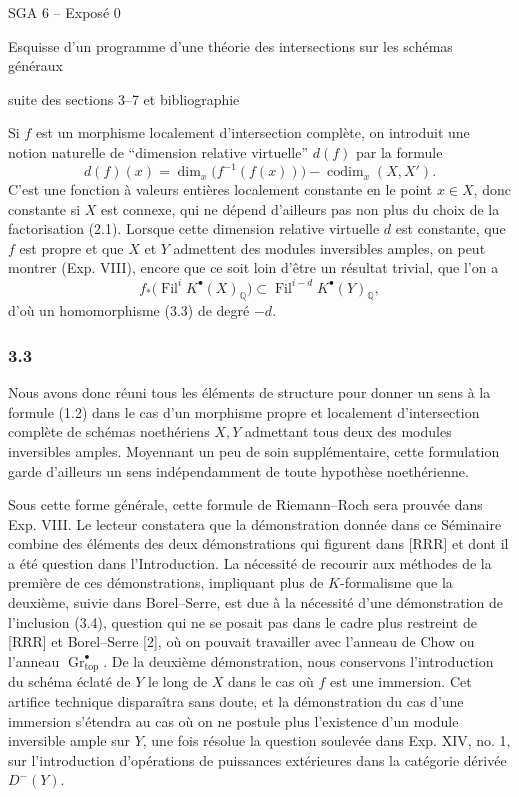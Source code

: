 \documentclass[11pt]{article}
\newcommand{\Gr}{\operatorname{Gr}}
\newcommand{\Fil}{\operatorname{Fil}}
\newcommand{\codim}{\operatorname{codim}}
\begin{document}
\begin{center}
{\Large SGA 6 -- Expos\'e 0}\par
{\large Esquisse d'un programme d'une th\'eorie des intersections sur les sch\'emas g\'en\'eraux}\par
{\large suite des sections 3--7 et bibliographie}
\end{center}

Si $f$ est un morphisme localement d'intersection compl\`ete, on introduit une notion naturelle de ``dimension relative virtuelle'' $d(f)$ par la formule
\[
d(f)(x)=\dim_x\bigl(f^{-1}(f(x))\bigr)-\codim_x(X,X').
\]
C'est une fonction \`a valeurs enti\`eres localement constante en le point $x\in X$, donc constante si $X$ est connexe, qui ne d\'epend d'ailleurs pas non plus du choix de la factorisation (2.1). Lorsque cette dimension relative virtuelle $d$ est constante, que $f$ est propre et que $X$ et $Y$ admettent des modules inversibles amples, on peut montrer (Exp. VIII), encore que ce soit loin d'\^etre un r\'esultat trivial, que l'on a
\begin{equation}\tag{3.4}
f_*\bigl(\Fil^iK^\bullet(X)_{\mathbb Q}\bigr)\subset \Fil^{i-d}K^\bullet(Y)_{\mathbb Q},
\end{equation}
d'o\`u un homomorphisme (3.3) de degr\'e $-d$.

\subsubsection*{3.3}
Nous avons donc r\'euni tous les \'el\'ements de structure pour donner un sens \`a la formule (1.2) dans le cas d'un morphisme propre et localement d'intersection compl\`ete de sch\'emas noeth\'eriens $X,Y$ admettant tous deux des modules inversibles amples. Moyennant un peu de soin suppl\'ementaire, cette formulation garde d'ailleurs un sens ind\'ependamment de toute hypoth\`ese noeth\'erienne.

Sous cette forme g\'en\'erale, cette formule de Riemann--Roch sera prouv\'ee dans Exp. VIII. Le lecteur constatera que la d\'emonstration donn\'ee dans ce S\'eminaire combine des \'el\'ements des deux d\'emonstrations qui figurent dans [RRR] et dont il a \'et\'e question dans l'Introduction. La n\'ecessit\'e de recourir aux m\'ethodes de la premi\`ere de ces d\'emonstrations, impliquant plus de $K$-formalisme que la deuxi\`eme, suivie dans Borel--Serre, est due \`a la n\'ecessit\'e d'une d\'emonstration de l'inclusion (3.4), question qui ne se posait pas dans le cadre plus restreint de [RRR] et Borel--Serre [2], o\`u on pouvait travailler avec l'anneau de Chow ou l'anneau $\Gr^\bullet_{\mathrm{top}}$. De la deuxi\`eme d\'emonstration, nous conservons l'introduction du sch\'ema \'eclat\'e de $Y$ le long de $X$ dans le cas o\`u $f$ est une immersion. Cet artifice technique dispara\^itra sans doute, et la d\'emonstration du cas d'une immersion s'\'etendra au cas o\`u on ne postule plus l'existence d'un module inversible ample sur $Y$, une fois r\'esolue la question soulev\'ee dans Exp. XIV, no. 1, sur l'introduction d'op\'erations de puissances ext\'erieures dans la cat\'egorie d\'eriv\'ee $D^-(Y)$.
\end{document}
